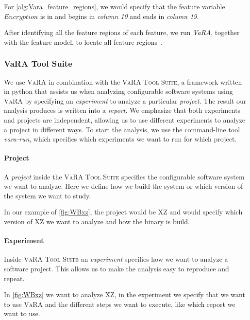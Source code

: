 For \autoref{alg:Vara_feature_regions}, we would specify that the feature variable
$Encryption$ is in  and begins in \emph{column 10} and ends in \emph{column 19}.

After identifying all the feature regions of each feature, we run \textit{VaRA}, together with the feature model, to locate all feature regions~\cite{VaRA-Flo}.

\subsubsection{VaRA Tool Suite}
We use \textsc{VaRA} in combination with the \textsc{VaRA Tool Suite}, a framework written in python that assists us 
when analyzing configurable software systems using \textsc{VaRA} by specifying an \emph{experiment} to analyze a particular \emph{project}. 
The result our analysis produces is written into a \emph{report}. We emphasize that both experiments and projects are independent, 
allowing us to use different experiments to analyze a project in different ways.
To start the analysis, we use the command-line tool \emph{vara-run}, which specifies which experiments we want to run for which project.

\paragraph{Project}
A \emph{project} inside the \textsc{VaRA Tool Suite} specifies the configurable software system we want to analyze. 
Here we define how we build the system or which version of the system we want to study.

In our example of \autoref{fig:WBxz}, the project would be \textsc{XZ} and would specify which version of \textsc{XZ} we want to analyze and how the binary is build.

\paragraph{Experiment}
Inside \textsc{VaRA Tool Suite} an \emph{experiment} specifies how we want to analyze a software project. This allows us to make the analysis
easy to reproduce and repeat.

In \autoref{fig:WBxz} we want to analyze \textsc{XZ}, in the experiment we specify that we want to use \textsc{VaRA} and the different steps we want to execute,
like which report we want to use.


